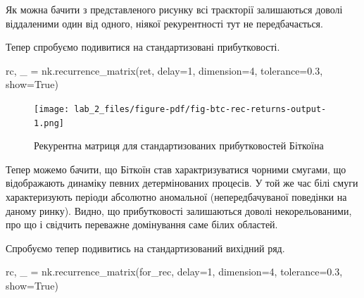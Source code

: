 \documentclass[
  letterpaper,
]{report}
\newenvironment{Shaded}{\begin{snugshade}}{\end{snugshade}}
\newcommand{\DecValTok}[1]{\textcolor[rgb]{0.68,0.00,0.00}{#1}}
\newcommand{\FloatTok}[1]{\textcolor[rgb]{0.68,0.00,0.00}{#1}}
\newcommand{\NormalTok}[1]{\textcolor[rgb]{0.00,0.23,0.31}{#1}}
\newcommand{\OperatorTok}[1]{\textcolor[rgb]{0.37,0.37,0.37}{#1}}
\newcommand{\VariableTok}[1]{\textcolor[rgb]{0.07,0.07,0.07}{#1}}
\begin{document}
Як можна бачити з представленого рисунку всі траєкторії залишаються
доволі віддаленими один від одного, ніякої рекурентності тут не
передбачається.

Тепер спробуємо подивитися на стандартизовані прибутковості.

\begin{Shaded}
\begin{Highlighting}[]
\NormalTok{rc, \_ }\OperatorTok{=}\NormalTok{ nk.recurrence\_matrix(ret, }
\NormalTok{                            delay}\OperatorTok{=}\DecValTok{1}\NormalTok{, }
\NormalTok{                            dimension}\OperatorTok{=}\DecValTok{4}\NormalTok{,}
\NormalTok{                            tolerance}\OperatorTok{=}\FloatTok{0.3}\NormalTok{,}
\NormalTok{                            show}\OperatorTok{=}\VariableTok{True}\NormalTok{)}
\end{Highlighting}
\end{Shaded}

\begin{figure}[H]

{\centering \texttt{[image: lab\_2\_files/figure-pdf/fig-btc-rec-returns-output-1.png]}

}

\caption{\label{fig-btc-rec-returns}Рекурентна матриця для
стандартизованих прибутковостей Біткоїна}

\end{figure}

Тепер можемо бачити, що Біткоїн став характризуватися чорними смугами,
що відображають динаміку певних детермінованих процесів. У той же час
білі смуги характеризують періоди абсолютно аномальної (непередбачуваної
поведінки на даному ринку). Видно, що прибутковості залишаються доволі
некорельованими, про що і свідчить переважне домінування саме білих
областей.

Спробуємо тепер подивитись на стандартизований вихідний ряд.

\begin{Shaded}
\begin{Highlighting}[]
\NormalTok{rc, \_ }\OperatorTok{=}\NormalTok{ nk.recurrence\_matrix(for\_rec, }
\NormalTok{                            delay}\OperatorTok{=}\DecValTok{1}\NormalTok{, }
\NormalTok{                            dimension}\OperatorTok{=}\DecValTok{4}\NormalTok{,}
\NormalTok{                            tolerance}\OperatorTok{=}\FloatTok{0.3}\NormalTok{,}
\NormalTok{                            show}\OperatorTok{=}\VariableTok{True}\NormalTok{)}
\end{Highlighting}
\end{Shaded}
\end{document}
